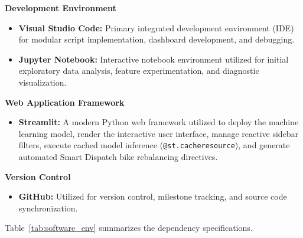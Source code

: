 \documentclass[12pt, a4paper]{article}
\renewcommand{\_}{\textunderscore\allowbreak}
\begin{document}
\noindent \textbf{Development Environment}
\begin{itemize}
    \item \textbf{Visual Studio Code:} Primary integrated development environment (IDE) for modular script implementation, dashboard development, and debugging.
    \item \textbf{Jupyter Notebook:} Interactive notebook environment utilized for initial exploratory data analysis, feature experimentation, and diagnostic visualization.
\end{itemize}

\noindent \textbf{Web Application Framework}
\begin{itemize}
    \item \textbf{Streamlit:} A modern Python web framework utilized to deploy the machine learning model, render the interactive user interface, manage reactive sidebar filters, execute cached model inference (\texttt{@st.cache\_resource}), and generate automated Smart Dispatch bike rebalancing directives.
\end{itemize}

\noindent \textbf{Version Control}
\begin{itemize}
    \item \textbf{GitHub:} Utilized for version control, milestone tracking, and source code synchronization.
\end{itemize}

Table~\ref{tab:software_env} summarizes the dependency specifications.
\end{document}
